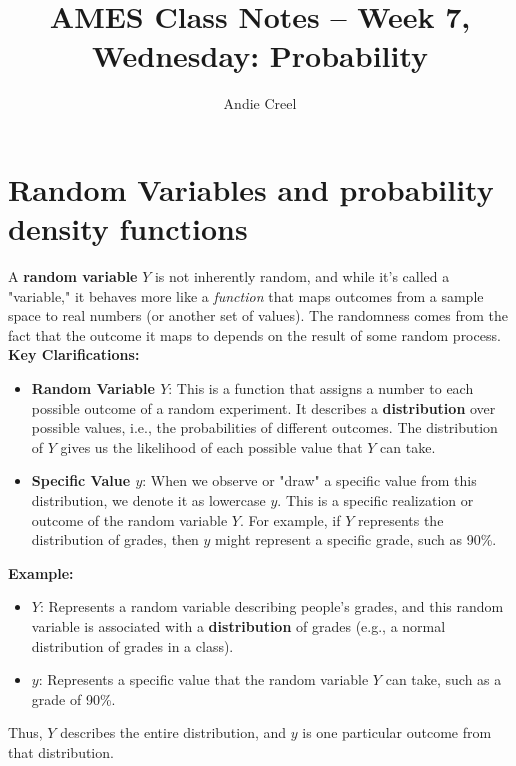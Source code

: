 \documentclass{article}
\title{AMES Class Notes -- Week 7, Wednesday: Probability}
\author{Andie Creel}
\begin{document}
\maketitle

\section{Random Variables and probability density functions}

A \textbf{random variable} \( Y \) is not inherently random, and while it's called a "variable," it behaves more like a \textit{function} that maps outcomes from a sample space to real numbers (or another set of values). The randomness comes from the fact that the outcome it maps to depends on the result of some random process.\\

\textbf{Key Clarifications:}

\begin{itemize}
    \item \textbf{Random Variable \( Y \)}: This is a function that assigns a number to each possible outcome of a random experiment. It describes a \textbf{distribution} over possible values, i.e., the probabilities of different outcomes. The distribution of \( Y \) gives us the likelihood of each possible value that \( Y \) can take.

    \item \textbf{Specific Value \( y \)}: When we observe or "draw" a specific value from this distribution, we denote it as lowercase \( y \). This is a specific realization or outcome of the random variable \( Y \). For example, if \( Y \) represents the distribution of grades, then \( y \) might represent a specific grade, such as 90\%.
\end{itemize}

\textbf{Example:}
\begin{itemize}
    \item \( Y \): Represents a random variable describing people's grades, and this random variable is associated with a \textbf{distribution} of grades (e.g., a normal distribution of grades in a class).
    \item \( y \): Represents a specific value that the random variable \( Y \) can take, such as a grade of 90\%.
\end{itemize}

Thus, \( Y \) describes the entire distribution, and \( y \) is one particular outcome from that distribution.
\end{document}

